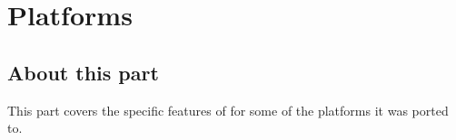 \part{\urbi Platforms}
\label{part:platforms}

\chapter*{About this part}

This part covers the specific features of \urbi for some of the
platforms it was ported to.





